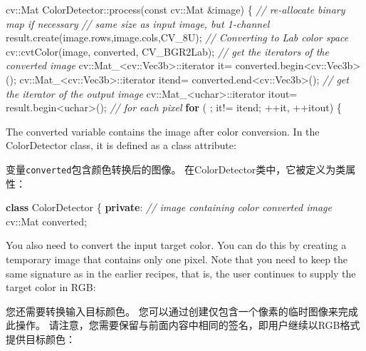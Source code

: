 \documentclass[]{article}
\newenvironment{Shaded}{}{}
\newcommand{\AttributeTok}[1]{\textcolor[rgb]{0.49,0.56,0.16}{#1}}
\newcommand{\CommentTok}[1]{\textcolor[rgb]{0.38,0.63,0.69}{\textit{#1}}}
\newcommand{\ControlFlowTok}[1]{\textcolor[rgb]{0.00,0.44,0.13}{\textbf{#1}}}
\newcommand{\ExtensionTok}[1]{#1}
\newcommand{\KeywordTok}[1]{\textcolor[rgb]{0.00,0.44,0.13}{\textbf{#1}}}
\newcommand{\NormalTok}[1]{#1}
\begin{document}
\begin{Shaded}
\begin{Highlighting}[]
\NormalTok{cv::Mat ColorDetector::process(}\AttributeTok{const}\NormalTok{ cv::Mat &image) \{}
    \CommentTok{// re-allocate binary map if necessary}
    \CommentTok{// same size as input image, but 1-channel}
\NormalTok{    result.create(image.rows,image.cols,CV_8U);}
    \CommentTok{// Converting to Lab color space}
\NormalTok{    cv::cvtColor(image, converted, CV_BGR2Lab);}
    \CommentTok{// get the iterators of the converted image}
\NormalTok{    cv::Mat_<cv::Vec3b>::iterator it= converted.begin<cv::Vec3b>();}
\NormalTok{    cv::Mat_<cv::Vec3b>::iterator itend= converted.end<cv::Vec3b>();}
    \CommentTok{// get the iterator of the output image}
\NormalTok{    cv::Mat_<}\ExtensionTok{uchar}\NormalTok{>::iterator itout= result.begin<}\ExtensionTok{uchar}\NormalTok{>();}
    \CommentTok{// for each pixel}
    \ControlFlowTok{for}\NormalTok{ ( ; it!= itend; ++it, ++itout) \{}
\end{Highlighting}
\end{Shaded}

The converted variable contains the image after color conversion. In the
ColorDetector class, it is defined as a class attribute:

变量\texttt{converted}包含颜色转换后的图像。
在ColorDetector类中，它被定义为类属性：

\begin{Shaded}
\begin{Highlighting}[]
\KeywordTok{class}\NormalTok{ ColorDetector \{}
\KeywordTok{private}\NormalTok{:}
    \CommentTok{// image containing color converted image}
\NormalTok{    cv::Mat converted;}
\end{Highlighting}
\end{Shaded}

You also need to convert the input target color. You can do this by
creating a temporary image that contains only one pixel. Note that you
need to keep the same signature as in the earlier recipes, that is, the
user continues to supply the target color in RGB:

您还需要转换输入目标颜色。
您可以通过创建仅包含一个像素的临时图像来完成此操作。
请注意，您需要保留与前面内容中相同的签名，即用户继续以RGB格式提供目标颜色：
\end{document}
